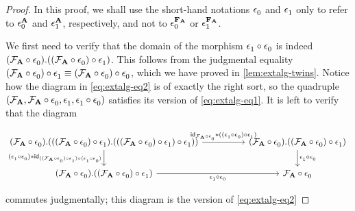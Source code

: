 \begin{proof}
In this proof, we shall use the short-hand notations $\cftctxext$ and $\cftfamext$
only to refer to $\cftctxext[\cftalg{A}]$ and $\cftfamext[\cftalg{A}]$, respectively,
and not to $\cftctxext[\cftalg{F_A}]$ or $\cftfamext[\cftalg{F_A}]$.

We first need to verify that the domain of the morphism 
$\jcomp{}{\cftctxext}{\cftfamext}$ is indeed
$\ctxext{\jcomp{}{\cftctxext}{\cftalgf{\cftalg{A}}}}{\jcomp{}{\cftfamext}{{}{\cftctxext}{\cftalgf{\cftalg{A}}}}}$. 
This follows from the judgmental equality
$\jcomp{}{\cftfamext}{{}{\cftctxext}{\cftalgf{\cftalg{A}}}}\jdeq
\jcomp{}{\cftctxext}{{}{\cftctxext}{\cftalgf{\cftalg{A}}}}$, which we have proved in
\autoref{lem:extalg-twins}. Notice how the diagram in \autoref{eq:extalg-eq2} is
of exactly the right sort, so the quadruple
$(\cftalgf{\cftalg{A}},\jcomp{}{\cftctxext}{\cftalgf{\cftalg{A}}},\cftfamext,\jcomp{}{\cftctxext}{\cftfamext})$
satisfies its version of \autoref{eq:extalg-eq1}. It is left to verify that the diagram
\begin{small}
\begin{equation*}
\begin{tikzcd}[column sep=huge]
\ctxext
  { \jcomp{}{\cftctxext}{\cftalgf{\cftalg{A}}}
    }
  { { \jcomp{}{\cftfamext}{%
        \jcomp{}{\cftctxext}{\cftalgf{\cftalg{A}}}
        }
      }
    { \jcomp{}{\cftfamext}{%
        \jcomp{}{\cftfamext}{%
          \jcomp{}{\cftctxext}{\cftalgf{\cftalg{A}}}
          }
        }
      }
    } 
  \ar{r}
    { \jvcomp{}{\idtm{\jcomp{}{\cftctxext}{\cftalgf{\cftalg{A}}}}}{%
        \jcomp{}{\cftfamext}{%
          \jcomp{}{\cftctxext}{\cftfamext}}}}
  \ar{d}[swap]{
    \jvcomp{}{\jcomp{}{\cftctxext}{\cftfamext}}{%
      \idtm{
        \jcomp{}{\jcomp{}{\cftctxext}{\cftfamext}}{%
          \jcomp{}{\cftfamext}{%
            \jcomp{}{\cftctxext}{\cftalgf{\cftalg{A}}}
            }
          }
        }
      }
    }
& \ctxext
    {\jcomp{}{\cftctxext}{\cftalgf{\cftalg{A}}}}
    {\jcomp{}{\cftfamext}{\jcomp{}{\cftctxext}{\cftalgf{\cftalg{A}}}}} 
  \ar{d}{\jcomp{}{\cftctxext}{\cftfamext}}
  \\
\ctxext
  {\jcomp{}{\cftctxext}{\cftalgf{\cftalg{A}}}}
  {\jcomp{}{\cftfamext}{\jcomp{}{\cftctxext}{\cftalgf{\cftalg{A}}}}} 
  \ar{r}[swap]{\jcomp{}{\cftctxext}{\cftfamext}} 
& \jcomp{}{\cftctxext}{\cftalgf{\cftalg{A}}}
\end{tikzcd}
\end{equation*}
\end{small}%
commutes judgmentally; this diagram is the version of \autoref{eq:extalg-eq2}

\end{proof}
